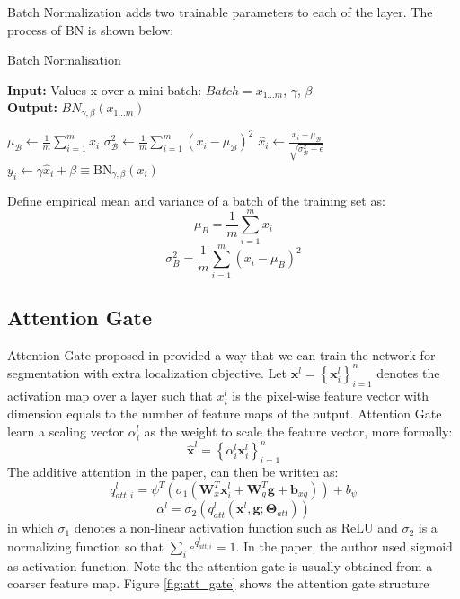 Batch Normalization adds two trainable parameters to each of the layer. The process of BN is shown below:
\begin{algorithm}
    \caption{Batch Normalisation}\label{BatchNorm}
    \hspace*{\algorithmicindent} \textbf{Input:} Values x over a mini-batch: $Batch = {x_{1...m}}$, $\gamma$, $\beta$\\
    \hspace*{\algorithmicindent} \textbf{Output:} $BN_{\gamma,\beta}(x_{1...m})$
    \begin{algorithmic}[]
    \State $\mu_{\mathcal{B}} \gets \frac{1}{m} \sum_{i=1}^{m} x_{i}$    
    \State $\sigma_{\mathcal{B}}^{2} \leftarrow \frac{1}{m} \sum_{i=1}^{m}\left(x_{i}-\mu_{\mathcal{B}}\right)^{2}$
    \State {}
    \State $\widehat{x}_{i} \leftarrow \frac{x_{i}-\mu_{\mathcal{B}}}{\sqrt{\sigma_{\mathcal{B}}^{2}+\epsilon}}$  
    \State {}
    \State $y_{i} \leftarrow \gamma \widehat{x}_{i}+\beta \equiv \mathrm{B} \mathrm{N}_{\gamma, \beta}\left(x_{i}\right)$
    \end{algorithmic}
    \end{algorithm}
Define empirical mean and variance of a batch of the training set as:
$$\mu_{B}=\frac{1}{m} \sum_{i=1}^{m} x_{i}$$
$$\sigma_{B}^{2}=\frac{1}{m} \sum_{i=1}^{m}\left(x_{i}-\mu_{B}\right)^{2}$$


\subsection{Attention Gate}
Attention Gate proposed in \cite{} provided a way that we can train the network for segmentation with extra localization objective.
Let $\mathbf{x}^{l}=\left\{\mathbf{x}_{i}^{l}\right\}_{i=1}^{n}$ denotes the activation map over a layer such that $x_{i}^{l}$ is the pixel-wise feature vector with dimension equals to the number of feature maps of the output. Attention Gate learn a scaling vector $\alpha_{i}^{l}$ as the weight to scale the feature vector, more formally:
$$\hat{\mathbf{x}}^{l}=\left\{\alpha_{i}^{l} \mathbf{x}_{i}^{l}\right\}_{i=1}^{n}$$
The additive attention in the paper, can then be written as:
$$q_{a t t, i}^{l}=\psi^{T}\left(\sigma_{1}\left(\boldsymbol{W}_{x}^{T} \boldsymbol{x}_{i}^{l}+\boldsymbol{W}_{g}^{T} \boldsymbol{g}+\boldsymbol{b}_{x g}\right)\right)+b_{\psi}$$
$$\alpha^{l}=\sigma_{2}\left(q_{a t t}^{l}\left(\boldsymbol{x}^{l}, \boldsymbol{g} ; \boldsymbol{\Theta}_{a t t}\right)\right)$$
in which $\sigma_{1}$ denotes a non-linear activation function such as ReLU and $\sigma_{2}$ is a normalizing function so that $\sum_{i} e^{q_{a t t, i}^{l}} = 1$. In the paper, the author used sigmoid as activation function. Note the the attention gate is usually obtained from a coarser feature map. Figure \ref{fig:att_gate} shows the attention gate structure

